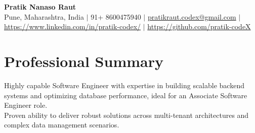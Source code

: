 \documentclass[10.5pt,a4paper]{article}
\begin{document}
\begin{center}
{\Large\bfseries Pratik Nanaso Raut}\\[2pt]
Pune, Maharashtra, India $|$ 91+ 8600475940 $|$ \href{mailto:pratikraut.codex@gmail.com}{pratikraut.codex@gmail.com} $|$ \href{https://www.linkedin.com/in/pratik-codex/}{https://www.linkedin.com/in/pratik-codex/} $|$ \href{https://github.com/pratik-codeX}{https://github.com/pratik-codeX}
\end{center}
\vspace{-2pt}
\section{Professional Summary}
Highly capable Software Engineer with expertise in building scalable backend systems and optimizing database performance, ideal for an Associate Software Engineer role.\\[2pt]
Proven ability to deliver robust solutions across multi-tenant architectures and complex data management scenarios.
\end{document}
